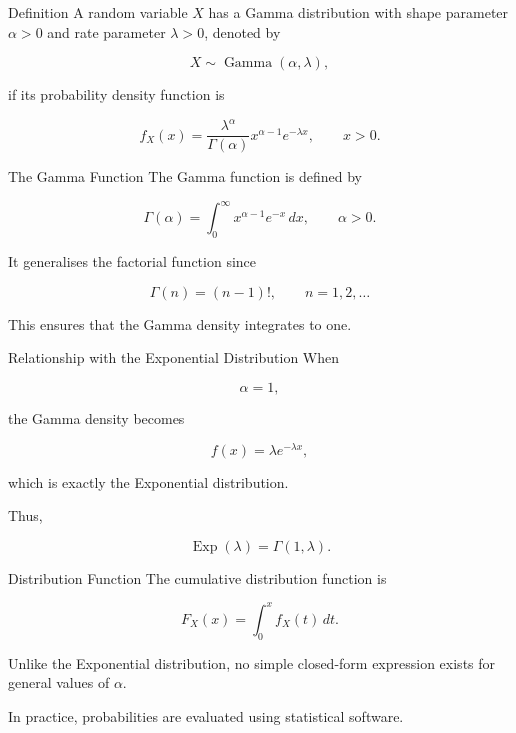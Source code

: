 \documentclass[
  ignorenonframetext,
  aspectratio=169,
]{beamer}
\begin{document}
\begin{frame}{Definition}
\protect{}\label{definition}
A random variable \(X\) has a Gamma distribution with shape parameter
\(\alpha>0\) and rate parameter \(\lambda>0\), denoted by

\[
X\sim\operatorname{Gamma}(\alpha,\lambda),
\]

if its probability density function is

\[
f_X(x)=
\frac{\lambda^\alpha}{\Gamma(\alpha)}
x^{\alpha-1}
e^{-\lambda x},
\qquad x>0.
\]
\end{frame}

\begin{frame}{The Gamma Function}
\protect{}\label{the-gamma-function}
The Gamma function is defined by

\[
\Gamma(\alpha)
=
\int_0^\infty
x^{\alpha-1}e^{-x}\,dx,
\qquad
\alpha>0.
\]

It generalises the factorial function since

\[
\Gamma(n)=(n-1)!,
\qquad n=1,2,\ldots
\]

This ensures that the Gamma density integrates to one.
\end{frame}

\begin{frame}{Relationship with the Exponential Distribution}
\protect{}\label{relationship-with-the-exponential-distribution}
When

\[
\alpha=1,
\]

the Gamma density becomes

\[
f(x)
=
\lambda e^{-\lambda x},
\]

which is exactly the Exponential distribution.

Thus,

\[
\operatorname{Exp}(\lambda)
=
\Gamma(1,\lambda).
\]
\end{frame}

\begin{frame}{Distribution Function}
\protect{}\label{distribution-function}
The cumulative distribution function is

\[
F_X(x)
=
\int_0^x
f_X(t)\,dt.
\]

Unlike the Exponential distribution, no simple closed-form expression
exists for general values of \(\alpha\).

In practice, probabilities are evaluated using statistical software.
\end{frame}
\end{document}
